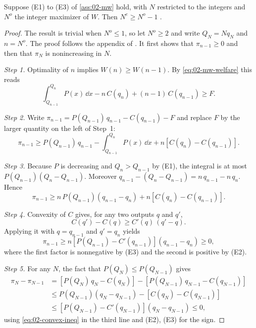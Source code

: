 \begin{proposition}\label{prop:02-mw-integer}
Suppose (E1) to (E3) of \cref{ass:02-mw} hold, with $N$ restricted to the integers and $N^o$ the integer maximizer of
$W$. Then $N^e \ge N^o - 1$ \citep[Proposition~2]{MankiwWhinston1986}.
\end{proposition}

\begin{proof}
The result is trivial when $N^o \le 1$, so let $N^o \ge 2$ and write $Q_N = N q_N$ and $n = N^o$. The proof follows
the appendix of \citet[p.~58]{MankiwWhinston1986}. It first shows that $\pi_{n - 1} \ge 0$ and then that $\pi_N$ is
nonincreasing in $N$.

\emph{Step 1.} Optimality of $n$ implies $W(n) \ge W(n - 1)$. By \eqref{eq:02-mw-welfare} this reads
\begin{equation*}
\int_{Q_{n-1}}^{Q_n} P(x)\, \dd x - n\, C(q_n) + (n - 1)\, C(q_{n-1}) \ge F .
\end{equation*}

\emph{Step 2.} Write $\pi_{n-1} = P(Q_{n-1})\, q_{n-1} - C(q_{n-1}) - F$ and replace $F$ by the larger quantity on
the left of Step~1:
\begin{equation*}
\pi_{n-1} \ge P(Q_{n-1})\, q_{n-1} - \int_{Q_{n-1}}^{Q_n} P(x)\, \dd x + n\left[C(q_n) - C(q_{n-1})\right].
\end{equation*}

\emph{Step 3.} Because $P$ is decreasing and $Q_n > Q_{n-1}$ by (E1), the integral is at most
$P(Q_{n-1})(Q_n - Q_{n-1})$. Moreover $q_{n-1} - (Q_n - Q_{n-1}) = n\, q_{n-1} - n\, q_n$. Hence
\begin{equation*}
\pi_{n-1} \ge n\, P(Q_{n-1})\left(q_{n-1} - q_n\right) + n\left[C(q_n) - C(q_{n-1})\right].
\end{equation*}

\emph{Step 4.} Convexity of $C$ gives, for any two outputs $q$ and $q'$,
\begin{equation}\label{eq:02-convex-ineq}
C(q') - C(q) \ge C'(q)\,(q' - q) .
\end{equation}
Applying it with $q = q_{n-1}$ and $q' = q_n$ yields
\begin{equation*}
\pi_{n-1} \ge n\left[P(Q_{n-1}) - C'(q_{n-1})\right]\left(q_{n-1} - q_n\right) \ge 0 ,
\end{equation*}
where the first factor is nonnegative by (E3) and the second is positive by (E2).

\emph{Step 5.} For any $N$, the fact that $P(Q_N) \le P(Q_{N-1})$ gives
\begin{align*}
\pi_N - \pi_{N-1} &= \left[P(Q_N)\, q_N - C(q_N)\right] - \left[P(Q_{N-1})\, q_{N-1} - C(q_{N-1})\right] \\
&\le P(Q_{N-1})\left(q_N - q_{N-1}\right) - \left[C(q_N) - C(q_{N-1})\right] \\
&\le \left[P(Q_{N-1}) - C'(q_{N-1})\right]\left(q_N - q_{N-1}\right) \le 0 ,
\end{align*}
using \eqref{eq:02-convex-ineq} in the third line and (E2), (E3) for the sign.


\end{proof}
